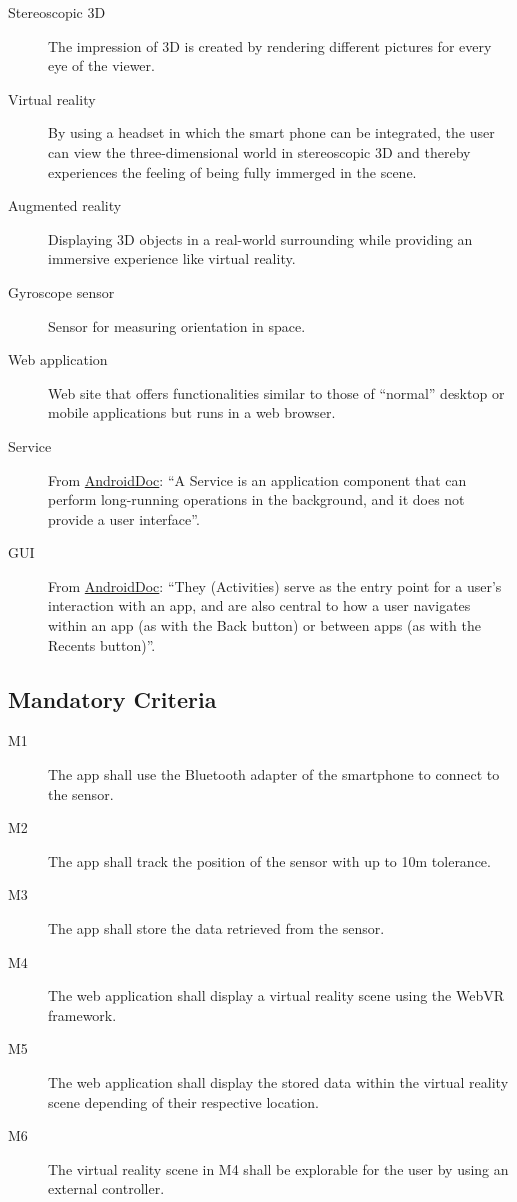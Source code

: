 \begin{description}
	\item[Stereoscopic 3D] The impression of 3D is created by rendering different pictures for every eye of the viewer.
	\item[Virtual reality] By using a headset in which the smart phone can be integrated, the user can view the three-dimensional world in stereoscopic 3D and thereby experiences the feeling of being fully immerged in the scene.
	\item[Augmented reality] Displaying 3D objects in a real-world surrounding while providing an immersive experience like virtual reality.
	\item[Gyroscope sensor] Sensor for measuring orientation in space.
	\item[Web application] Web site that offers functionalities similar to those of ``normal'' desktop or mobile applications but runs in a web browser.
	\item[Service] From \href{https://developer.android.com/guide/components/services.html}{AndroidDoc}: ``A Service is an application component that can perform long-running operations in the background, and it does not provide a user interface''.
	\item[GUI] From \href{https://developer.android.com/guide/components/activities.html}{AndroidDoc}: ``They (Activities) serve as the entry point for a user's interaction with an app, and are also central to how a user navigates within an app (as with the Back button) or between apps (as with the Recents button)''.
\end{description}

\bigskip

\subsection{Mandatory Criteria}

\begin{description}
	\item[M1] The app shall use the Bluetooth adapter of the smartphone to connect to the sensor.
	\item[M2] The app shall track the position of the sensor with up to 10m tolerance.
	\item[M3] The app shall store the data retrieved from the sensor.
	\item[M4] The web application shall display a virtual reality scene using the WebVR framework.
	\item[M5] The web application shall display the stored data within the virtual reality scene depending of their respective location.
	\item[M6] The virtual reality scene in M4 shall be explorable for the user by using an external controller.

\end{description}

